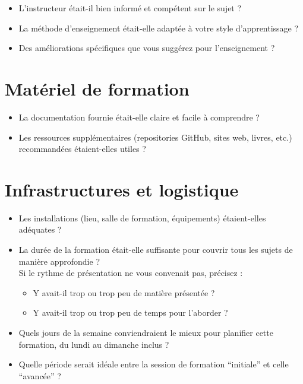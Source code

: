 \documentclass[final]{mcarticle}
\begin{document}
\begin{itemize}
\item L'instructeur était-il bien informé et compétent sur le sujet ?

\item La méthode d'enseignement était-elle adaptée à votre style d'apprentissage ?

\item Des améliorations spécifiques que vous suggérez pour l'enseignement ?
\end{itemize}

\vspace{13pt}

\section{Matériel de formation}
\label{sec:orgb086fbe}

\begin{itemize}
\item La documentation fournie était-elle claire et facile à comprendre ?

\item Les ressources supplémentaires (repositories GitHub, sites web, livres, etc.)
recommandées étaient-elles utiles ?
\end{itemize}

\section{Infrastructures et logistique}
\label{sec:org031aa2d}

\begin{itemize}
\item Les installations (lieu, salle de formation, équipements) étaient-elles adéquates ?

\item La durée de la formation était-elle suffisante pour couvrir tous les sujets de
manière approfondie ? \\[0pt]
Si le rythme de présentation ne vous convenait pas, précisez :
\begin{itemize}
\item Y avait-il trop ou trop peu de matière présentée ?
\item Y avait-il trop ou trop peu de temps pour l'aborder ?
\end{itemize}

\item Quels jours de la semaine conviendraient le mieux pour planifier cette
formation, du lundi au dimanche inclus ?

\item Quelle période serait idéale entre la session de formation ``initiale'' et celle
``avancée'' ?
\end{itemize}
\end{document}
